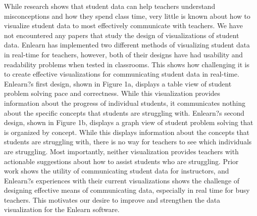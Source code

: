 \documentclass{sigchi}
\begin{document}
While research shows that student data can help teachers understand misconceptions and how they spend class time, very little is known about how to visualize student data to most effectively communicate with teachers. We have not encountered any papers that study the design of visualizations of student data. Enlearn has implemented two different methods of visualizing student data in real-time for teachers, however, both of their designs have had usability and readability problems when tested in classrooms. This shows how challenging it is to create effective visualizations for communicating student data in real-time. Enlearn?s first design, shown in Figure 1a, displays a table view of student problem solving pace and correctness. While this visualization provides information about the progress of individual students, it communicates nothing about the specific concepts that students are struggling with. Enlearn?s second design, shown in Figure 1b, displays a graph view of student problem solving that is organized by concept. While this displays information about the concepts that students are struggling with, there is no way for teachers to see which individuals are struggling. Most importantly, neither visualization provides teachers with actionable suggestions about how to assist students who are struggling. Prior work shows the utility of communicating student data for instructors, and Enlearn?s experiences with their current visualizations shows the challenge of designing effective means of communicating data, especially in real time for busy teachers. This motivates our desire to improve and strengthen the data visualization for the Enlearn software.
\end{document}
